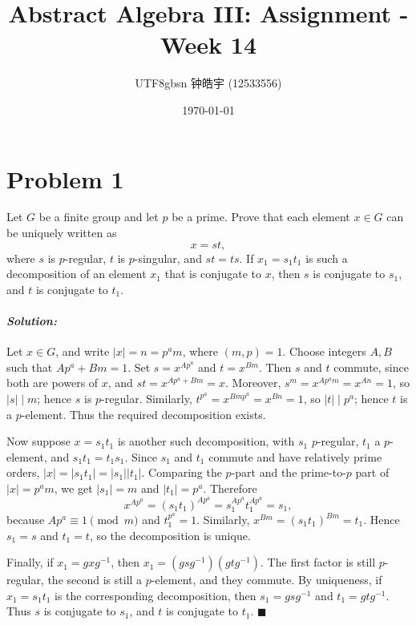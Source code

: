 \documentclass[12pt, a4paper]{article}
\title{Abstract Algebra III: Assignment - Week 14}
\author{
    \begin{CJK*}{UTF8}{gbsn}
    钟皓宇 (12533556)
    \end{CJK*}
}
\date{\today}
\theoremstyle{remark}
\newenvironment{solution}
  {\paragraph{\textit{Solution:}}\par\medskip}
  {\hfill$\blacksquare$\vspace{0.1cm}}
\begin{document}
\maketitle
\section*{Problem 1}
Let \(G\) be a finite group and let \(p\) be a prime. Prove that each element
\(x\in G\) can be uniquely written as
\[
x=st,
\]
where \(s\) is \(p\)-regular, \(t\) is \(p\)-singular, and \(st=ts\).
If \(x_1=s_1t_1\) is such a decomposition of an element \(x_1\) that is
conjugate to \(x\), then \(s\) is conjugate to \(s_1\), and \(t\) is conjugate
to \(t_1\).

\begin{solution}
Let \(x\in G\), and write \(|x|=n=p^a m\), where \((m,p)=1\). Choose integers
\(A,B\) such that \(Ap^a+Bm=1\). Set \(s=x^{Ap^a}\) and \(t=x^{Bm}\). Then
\(s\) and \(t\) commute, since both are powers of \(x\), and
\(st=x^{Ap^a+Bm}=x\). Moreover, \(s^m=x^{Ap^a m}=x^{An}=1\), so \(|s|\mid m\);
hence \(s\) is \(p\)-regular. Similarly, \(t^{p^a}=x^{Bmp^a}=x^{Bn}=1\), so
\(|t|\mid p^a\); hence \(t\) is a \(p\)-element. Thus the required
decomposition exists.

Now suppose \(x=s_1t_1\) is another such decomposition, with \(s_1\) \(p\)-regular,
\(t_1\) a \(p\)-element, and \(s_1t_1=t_1s_1\). Since \(s_1\) and \(t_1\) commute
and have relatively prime orders, \(|x|=|s_1t_1|=|s_1||t_1|\). Comparing the
\(p\)-part and the prime-to-\(p\) part of \(|x|=p^a m\), we get
\(|s_1|=m\) and \(|t_1|=p^a\). Therefore
\[
x^{Ap^a}=(s_1t_1)^{Ap^a}=s_1^{Ap^a}t_1^{Ap^a}=s_1,
\]
because \(Ap^a\equiv 1\pmod m\) and \(t_1^{p^a}=1\). Similarly,
\(x^{Bm}=(s_1t_1)^{Bm}=t_1\). Hence \(s_1=s\) and \(t_1=t\), so the
decomposition is unique.

Finally, if \(x_1=gxg^{-1}\), then
\(x_1=(gsg^{-1})(gtg^{-1})\). The first factor is still \(p\)-regular, the
second is still a \(p\)-element, and they commute. By uniqueness, if
\(x_1=s_1t_1\) is the corresponding decomposition, then
\(s_1=gsg^{-1}\) and \(t_1=gtg^{-1}\). Thus \(s\) is conjugate to \(s_1\), and
\(t\) is conjugate to \(t_1\).
\end{solution}
\end{document}
